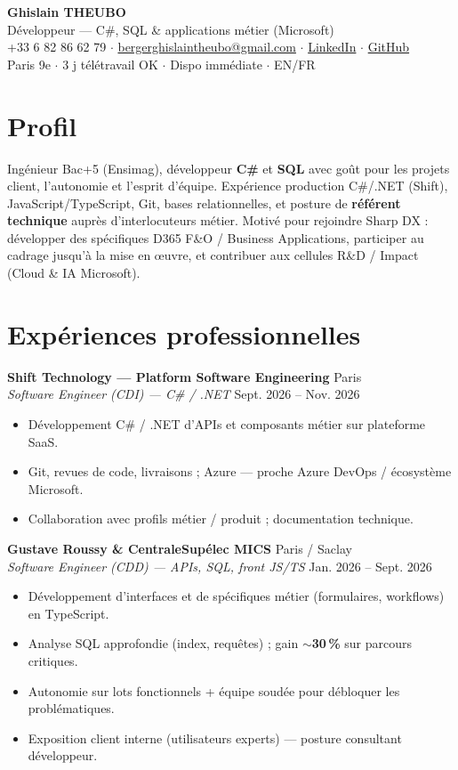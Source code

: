\documentclass[10pt,a4paper]{article}
\begin{document}
\begin{center}
{\LARGE\bfseries Ghislain THEUBO}\\[2pt]
{\large D\'eveloppeur --- C\#, SQL \& applications m\'etier (Microsoft)}\\[3pt]
+33 6 82 86 62 79 $\cdot$
\href{mailto:bergerghislaintheubo@gmail.com}{bergerghislaintheubo@gmail.com} $\cdot$
\href{https://www.linkedin.com/in/berger-ghislain}{LinkedIn} $\cdot$
\href{https://github.com/Bergerghislain}{GitHub}\\[1pt]
Paris 9e $\cdot$ 3 j t\'el\'etravail OK $\cdot$ Dispo imm\'ediate $\cdot$ EN/FR
\end{center}

\section{Profil}
Ing\'enieur Bac+5 (Ensimag), d\'eveloppeur \textbf{C\#} et \textbf{SQL} avec go\^ut pour les projets client, l'autonomie et l'esprit d'\'equipe. Exp\'erience production C\#/.NET (Shift), JavaScript/TypeScript, Git, bases relationnelles, et posture de \textbf{r\'ef\'erent technique} aupr\`es d'interlocuteurs m\'etier. Motiv\'e pour rejoindre Sharp DX : d\'evelopper des sp\'ecifiques D365 F\&O / Business Applications, participer au cadrage jusqu'\`a la mise en œuvre, et contribuer aux cellules R\&D / Impact (Cloud \& IA Microsoft).

\section{Exp\'eriences professionnelles}
\textbf{Shift Technology --- Platform Software Engineering} \hfill Paris\\
\textit{Software Engineer (CDI) --- C\# / .NET} \hfill Sept. 2026 -- Nov. 2026
\begin{itemize}
  \item D\'eveloppement C\# / .NET d'APIs et composants m\'etier sur plateforme SaaS.
  \item Git, revues de code, livraisons ; Azure --- proche Azure DevOps / \'ecosyst\`eme Microsoft.
  \item Collaboration avec profils m\'etier / produit ; documentation technique.
\end{itemize}

\textbf{Gustave Roussy \& CentraleSup\'elec MICS} \hfill Paris / Saclay\\
\textit{Software Engineer (CDD) --- APIs, SQL, front JS/TS} \hfill Jan. 2026 -- Sept. 2026
\begin{itemize}
  \item D\'eveloppement d'interfaces et de sp\'ecifiques m\'etier (formulaires, workflows) en TypeScript.
  \item Analyse SQL approfondie (index, requ\^etes) ; gain $\sim$\textbf{30\,\%} sur parcours critiques.
  \item Autonomie sur lots fonctionnels + \'equipe soud\'ee pour d\'ebloquer les probl\'ematiques.
  \item Exposition client interne (utilisateurs experts) --- posture consultant d\'eveloppeur.
\end{itemize}
\end{document}
